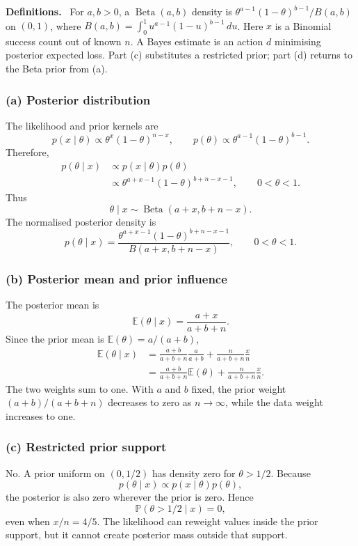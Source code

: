 \documentclass[11pt,a4paper]{article}
\newcommand{\given}{\mathrel{|}}
\newcommand{\E}{\mathbb{E}}
\newcommand{\studyheading}[1]{%
  \par\medskip\noindent\textcolor{statblue}{\textbf{#1.}}\ }
\begin{document}
\studyheading{Definitions}
For $a,b>0$, a $\operatorname{Beta}(a,b)$ density is
$\theta^{a-1}(1-\theta)^{b-1}/B(a,b)$ on $(0,1)$, where
$B(a,b)=\int_0^1u^{a-1}(1-u)^{b-1}\,du$.
Here $x$ is a Binomial success count out of known $n$.
A Bayes estimate is an action $d$ minimising posterior expected loss.
Part (c) substitutes a restricted prior; part (d) returns to the Beta prior from (a).

\subsubsection*{(a) Posterior distribution}

The likelihood and prior kernels are
\[
  p(x\given\theta)\propto\theta^x(1-\theta)^{n-x},
  \qquad
  p(\theta)\propto\theta^{a-1}(1-\theta)^{b-1}.
\]
Therefore,
\begin{align*}
  p(\theta\given x)
  &\propto p(x\given\theta)p(\theta)\\
  &\propto
    \theta^{a+x-1}(1-\theta)^{b+n-x-1},
    \qquad 0<\theta<1.
\end{align*}
Thus
\[
  \boxed{
    \theta\given x\sim\operatorname{Beta}(a+x,b+n-x)
  }.
\]
The normalised posterior density is
\[
  p(\theta\given x)
  =\frac{\theta^{a+x-1}(1-\theta)^{b+n-x-1}}
         {B(a+x,b+n-x)},
  \qquad 0<\theta<1.
\]

\subsubsection*{(b) Posterior mean and prior influence}

The posterior mean is
\[
  \E(\theta\given x)=\frac{a+x}{a+b+n}.
\]
Since the prior mean is $\E(\theta)=a/(a+b)$,
\begin{align*}
  \E(\theta\given x)
  &=
  \frac{a+b}{a+b+n}\frac{a}{a+b}
  +\frac{n}{a+b+n}\frac{x}{n}\\
  &=
  \boxed{
    \frac{a+b}{a+b+n}\E(\theta)
    +\frac{n}{a+b+n}\frac{x}{n}
  }.
\end{align*}
The two weights sum to one. With $a$ and $b$ fixed, the prior weight
$(a+b)/(a+b+n)$ decreases to zero as $n\to\infty$, while the data weight
increases to one.

\subsubsection*{(c) Restricted prior support}

No. A prior uniform on $(0,1/2)$ has density zero for $\theta>1/2$.
Because
\[
  p(\theta\given x)\propto p(x\given\theta)p(\theta),
\]
the posterior is also zero wherever the prior is zero. Hence
\[
  \boxed{\mathbb{P}(\theta>1/2\given x)=0},
\]
even when $x/n=4/5$. The likelihood can reweight values inside the prior
support, but it cannot create posterior mass outside that support.
\end{document}
